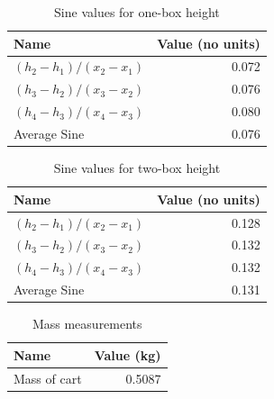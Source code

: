 \begin{table}[ht]
    \centering
    \begin{tabular}{|l|r|}
        \hline
        Name & Value (no units) \\
        \hline
        $\left( h_{2} - h_{1} \right) / \left( x_{2} - x_{1} \right)$ & 0.072 \\
        $\left( h_{3} - h_{2} \right) / \left( x_{3} - x_{2} \right)$ & 0.076 \\
        $\left( h_{4} - h_{3} \right) / \left( x_{4} - x_{3} \right)$ & 0.080 \\
        \hline
        Average Sine & 0.076 \\
        \hline
    \end{tabular}
    \caption{Sine values for one-box height}
    \label{table:07.sine.1}
\end{table}
\begin{table}[ht]
    \centering
    \begin{tabular}{|l|r|}
        \hline
        Name & Value (no units) \\
        \hline
        $\left( h_{2} - h_{1} \right) / \left( x_{2} - x_{1} \right)$ & 0.128 \\
        $\left( h_{3} - h_{2} \right) / \left( x_{3} - x_{2} \right)$ & 0.132 \\
        $\left( h_{4} - h_{3} \right) / \left( x_{4} - x_{3} \right)$ & 0.132 \\
        \hline
        Average Sine & 0.131 \\
        \hline
    \end{tabular}
    \caption{Sine values for two-box height}
    \label{table:07.sine.2}
\end{table}
\begin{table}[ht]
    \centering
    \begin{tabular}{|l|r|}
        \hline
        Name & Value (kg) \\
        \hline
        Mass of cart & 0.5087 \\
        \hline
    \end{tabular}
    \caption{Mass measurements}
    \label{table:07.mass}
\end{table}
